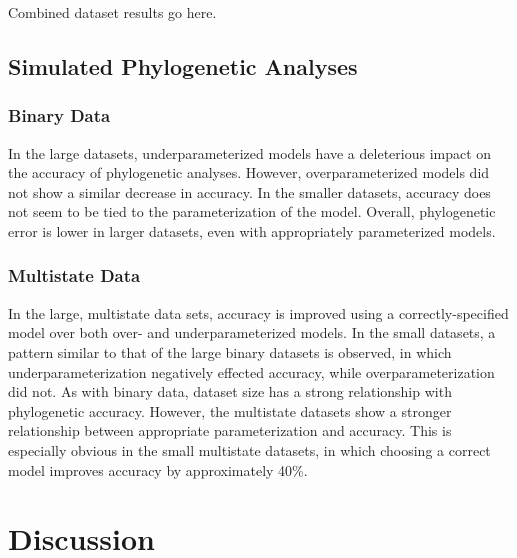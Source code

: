 \documentclass[]{sysbio}
\begin{document}
Combined dataset results go here. \par

\subsection{Simulated Phylogenetic Analyses}
\subsubsection{Binary Data}

In the large datasets, underparameterized models have a deleterious impact on the accuracy of phylogenetic analyses. 
However, overparameterized models did not show a similar decrease in accuracy.
In the smaller datasets, accuracy does not seem to be tied to the parameterization of the model. 
Overall, phylogenetic error is lower in larger datasets, even with appropriately parameterized models. \par

\subsubsection{Multistate Data}

In the large, multistate data sets, accuracy is improved using a correctly-specified model over both over- and underparameterized models. 
In the small datasets, a pattern similar to that of the large binary datasets is observed, in which underparameterization negatively effected accuracy, while overparameterization did not. 
As with binary data, dataset size has a strong relationship with phylogenetic accuracy. 
However, the multistate datasets show a stronger relationship between appropriate parameterization and accuracy. 
This is especially obvious in the small multistate datasets, in which choosing a correct model improves accuracy by approximately 40\%. \par

\section{Discussion}	
\end{document}
